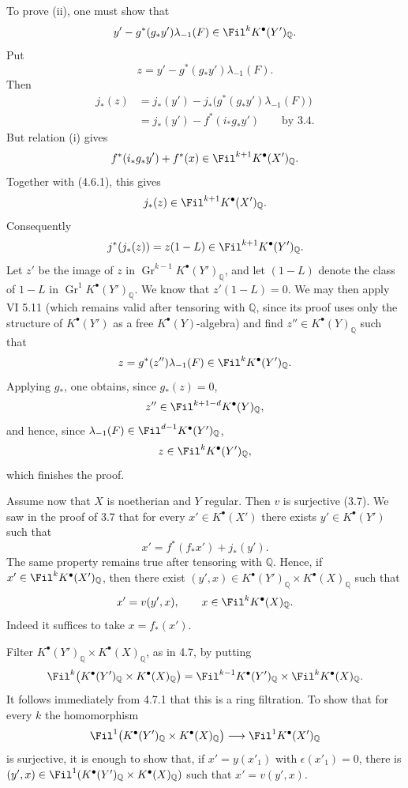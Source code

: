 To prove (ii), one must show that
\[
  y'-g^*(g_*y')\lambda_{-1}(F)\in\Fil^kK^\bullet(Y')_{\mathbb Q}.
\]
Put
\[
  z=y'-g^*(g_*y')\lambda_{-1}(F).
\]
Then
\[
\begin{aligned}
j_*(z)
  &=j_*(y')-j_*\bigl(g^*(g_*y')\lambda_{-1}(F)\bigr)\\
  &=j_*(y')-f^*(i_*g_*y')\qquad\text{by 3.4.}
\end{aligned}
\]
But relation (i) gives
\[
  f^*(i_*g_*y')+f^*(x)\in\Fil^{k+1}K^\bullet(X')_{\mathbb Q}.
\]
Together with (4.6.1), this gives
\[
  j_*(z)\in\Fil^{k+1}K^\bullet(X')_{\mathbb Q}.
\]
Consequently
\[
  j^*(j_*(z))=z(1-L)\in\Fil^{k+1}K^\bullet(Y')_{\mathbb Q}.
\]
Let \(z'\) be the image of \(z\) in
\(\operatorname{Gr}^{k-1}K^\bullet(Y')_{\mathbb Q}\), and let \((1-L)\) denote the class of \(1-L\) in \(\operatorname{Gr}^{1}K^\bullet(Y')_{\mathbb Q}\). We know that \(z'(1-L)=0\). We may then apply VI 5.11 (which remains valid after tensoring with \(\mathbb Q\), since its proof uses only the structure of \(K^\bullet(Y')\) as a free \(K^\bullet(Y)\)-algebra) and find \(z''\in K^\bullet(Y)_{\mathbb Q}\) such that
\[
  z=g^*(z'')\lambda_{-1}(F)\in\Fil^kK^\bullet(Y')_{\mathbb Q}.
\]
Applying \(g_*\), one obtains, since \(g_*(z)=0\),
\[
  z''\in\Fil^{k+1-d}K^\bullet(Y)_{\mathbb Q},
\]
and hence, since \(\lambda_{-1}(F)\in\Fil^{d-1}K^\bullet(Y')_{\mathbb Q}\),
\[
  z\in\Fil^kK^\bullet(Y')_{\mathbb Q},
\]
which finishes the proof.

Assume now that \(X\) is noetherian and \(Y\) regular. Then \(v\) is surjective (3.7). We saw in the proof of 3.7 that for every \(x'\in K^\bullet(X')\) there exists \(y'\in K^\bullet(Y')\) such that
\[
  x'=f^*(f_*x')+j_*(y').
\]
The same property remains true after tensoring with \(\mathbb Q\). Hence, if \(x'\in\Fil^kK^\bullet(X')_{\mathbb Q}\), then there exist \((y',x)\in K^\bullet(Y')_{\mathbb Q}\times K^\bullet(X)_{\mathbb Q}\) such that
\[
  x'=v(y',x),\qquad x\in\Fil^kK^\bullet(X)_{\mathbb Q}.
\]
Indeed it suffices to take \(x=f_*(x')\).

Filter \(K^\bullet(Y')_{\mathbb Q}\times K^\bullet(X)_{\mathbb Q}\), as in 4.7, by putting
\[
  \Fil^k\bigl(K^\bullet(Y')_{\mathbb Q}\times K^\bullet(X)_{\mathbb Q}\bigr)
  =
  \Fil^{k-1}K^\bullet(Y')_{\mathbb Q}\times \Fil^kK^\bullet(X)_{\mathbb Q}.
\]
It follows immediately from 4.7.1 that this is a ring filtration. To show that for every \(k\) the homomorphism
\[
  \Fil^1\bigl(K^\bullet(Y')_{\mathbb Q}\times K^\bullet(X)_{\mathbb Q}\bigr)
  \longrightarrow
  \Fil^1K^\bullet(X')_{\mathbb Q}
\]
is surjective, it is enough to show that, if \(x'=y(x'_1)\) with \(\epsilon(x'_1)=0\), there is \((y',x)\in\Fil^1(K^\bullet(Y')_{\mathbb Q}\times K^\bullet(X)_{\mathbb Q})\) such that \(x'=v(y',x)\).

